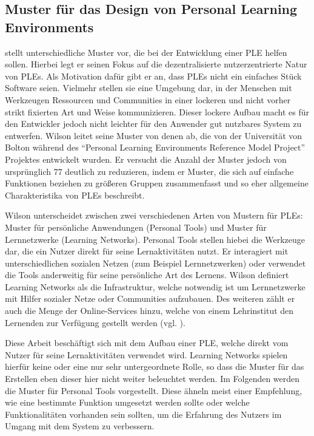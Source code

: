 \subsection{Muster für das Design von Personal Learning Environments}\label{section:wilson_patterns}
\cite{Wilson2008} stellt unterschiedliche Muster vor, die bei der Entwicklung einer PLE helfen sollen. Hierbei legt er seinen Fokus auf die dezentralisierte  nutzerzentrierte Natur von PLEs. Als Motivation dafür gibt er an, dass PLEs nicht ein einfaches Stück Software seien. Vielmehr stellen sie eine Umgebung dar, in der Menschen mit Werkzeugen Ressourcen und Communities in einer lockeren und nicht vorher strikt fixierten Art und Weise kommunizieren. Dieser lockere Aufbau macht es für den Entwickler jedoch nicht leichter für den Anwender gut nutzbares System zu entwerfen. Wilson leitet seine Muster von denen ab, die von der Universität von Bolton während des "`Personal Learning Environments Reference Model Project"' Projektes entwickelt wurden. Er versucht die Anzahl der Muster jedoch von ursprünglich 77 deutlich zu reduzieren, indem er Muster, die sich auf einfache Funktionen beziehen zu größeren Gruppen zusammenfasst und so eher allgemeine Charakteristika von PLEs beschreibt.

Wilson unterscheidet zwischen zwei verschiedenen Arten von Mustern für PLEs: Muster für persönliche Anwendungen (Personal Tools) und Muster für Lernnetzwerke (Learning Networks). Personal Tools stellen hiebei die Werkzeuge dar, die ein Nutzer direkt für seine Lernaktivitäten nutzt. Er interagiert mit unterschiedlichen sozialen Netzen (zum Beispiel Lernnetzwerken) oder verwendet die Tools anderweitig für seine persönliche Art des Lernens. 
Wilson definiert Learning Networks als die Infrastruktur, welche notwendig ist um Lernnetzwerke mit Hilfer sozialer Netze oder Communities aufzubauen. Des weiteren zählt er auch die Menge der Online-Services hinzu, welche von einem Lehrinstitut den Lernenden zur Verfügung gestellt werden (vgl. \cite{Wilson2008}).

Diese Arbeit beschäftigt sich mit dem Aufbau einer PLE, welche direkt vom Nutzer für seine Lernaktivitäten verwendet wird. Learning Networks spielen hierfür keine oder eine nur sehr untergeordnete Rolle, so dass die Muster für das Erstellen eben dieser hier nicht weiter beleuchtet werden. Im Folgenden werden die Muster für Personal Tools vorgestellt. Diese ähneln meist einer Empfehlung, wie eine bestimmte Funktion umgesetzt werden sollte oder welche Funktionalitäten vorhanden sein sollten, um die Erfahrung des Nutzers im Umgang mit dem System zu verbessern.

